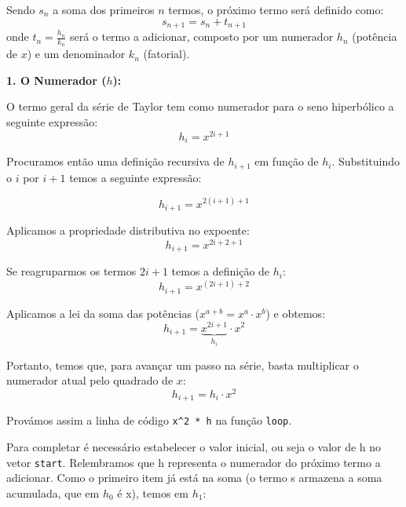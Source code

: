 \documentclass[11pt, a4paper, fleqn]{article}
\begin{document}
\noindent Sendo $s_n$ a soma dos primeiros $n$ termos, o próximo termo será definido como:
$$ s_{n+1} = s_n + t_{n+1} $$
onde $t_n = \frac{h_n}{k_n}$ será o termo a adicionar, composto por um numerador $h_n$ (potência de $x$) e um denominador $k_n$ (fatorial).


\noindent \textbf{1. O Numerador ($h$):}

\noindent O termo geral da série de Taylor tem como numerador para o seno hiperbólico a seguinte expressão:
\begin{equation}
    h_i = x^{2i+1}
\end{equation}

\noindent Procuramos então uma definição recursiva de $h_{i+1}$ em função de $h_i$.
Substituindo o $i$ por $i+1$ temos a seguinte expressão:

\begin{equation}
    h_{i+1} = x^{2(i+1)+1}
\end{equation}

\noindent Aplicamos a propriedade distributiva no expoente:
\begin{equation}
    h_{i+1} = x^{2i + 2 + 1}
\end{equation}

\noindent Se reagruparmos os termos $2i + 1$ temos a definição de $h_i$:
\begin{equation}
    h_{i+1} = x^{(2i + 1) + 2}
\end{equation}

\noindent Aplicamos a lei da soma das potências ($x^{a+b} = x^a \cdot x^b$) e obtemos:
\begin{equation}
    h_{i+1} = \underbrace{x^{2i+1}}_{h_i} \cdot x^2
\end{equation}

\noindent Portanto, temos que, para avançar um passo na série, basta multiplicar o numerador atual pelo quadrado de $x$:
\begin{equation} \label{eq:numerador_final}
    h_{i+1} = h_i \cdot x^2
\end{equation}

\noindent Provámos assim a linha de código \texttt{x\^{}2 * h} na função \texttt{loop}.

\noindent Para completar é necessário estabelecer o valor inicial, ou seja o valor de h no vetor \texttt{start}.
Relembramos que h representa o numerador do próximo termo a adicionar. Como o primeiro item já está na soma (o termo s armazena a soma acumulada, que em $h_0$ é x), temos em $h_1$:
\end{document}
